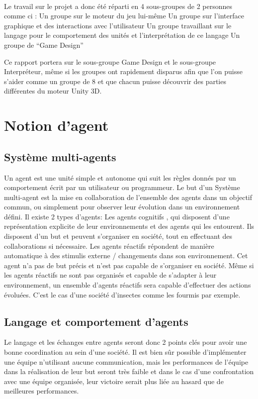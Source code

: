 \documentclass{report}
\begin{document}
\paragraph{}
Le travail sur le projet a donc été réparti en 4 sous-groupes de 2 personnes comme ci : 
Un groupe sur le moteur du jeu lui-même
Un groupe sur l’interface graphique et des interactions avec l’utilisateur
Un groupe travaillant sur le langage pour le comportement des unités et l’interprétation de ce langage
Un groupe de “Game Design” 

Ce rapport portera sur le sous-groupe Game Design et le sous-groupe Interpréteur, même si les groupes ont rapidement disparus afin que l’on puisse s’aider comme un groupe de 8 et que chacun puisse découvrir des parties différentes du moteur Unity 3D.
\section{Notion d'agent}
\subsection{Système multi-agents}
Un agent est une unité simple et autonome qui suit les règles donnés par un comportement  écrit par un utilisateur ou programmeur. 
Le but d’un Système multi-agent est la mise en collaboration de l’ensemble des agents dans un objectif commun, ou simplement pour observer leur évolution dans un environnement défini.
Il existe 2 types d’agents:
 Les agents cognitifs , qui disposent d’une représentation explicite de leur environnements et des agents qui les entourent. Ils disposent d’un but et peuvent s’organiser en société, tout en effectuant des collaborations si nécessaire.
Les agents réactifs répondent de manière automatique à des stimulis externe / changements dans son environnement. Cet agent n’a pas de but précis et n’est pas capable de s’organiser en société. 
Même si les agents réactifs ne sont pas organisés et capable de s’adapter à leur environnement, un ensemble d’agents réactifs sera capable d’effectuer des actions évoluées. C’est le cas d’une société d’insectes comme les fourmis par exemple. 


\subsection{Langage et comportement d’agents}
 Le langage et les échanges entre agents seront donc 2 points clés pour avoir une bonne coordination au sein d’une société.
Il est bien sûr possible d’implémenter une équipe n’utilisant aucune communication, mais les performances de l’équipe dans la réalisation de leur but seront très faible et dans le cas d’une confrontation avec une équipe organisée, leur victoire serait plus liée au hasard que de meilleures performances.
\end{document}
